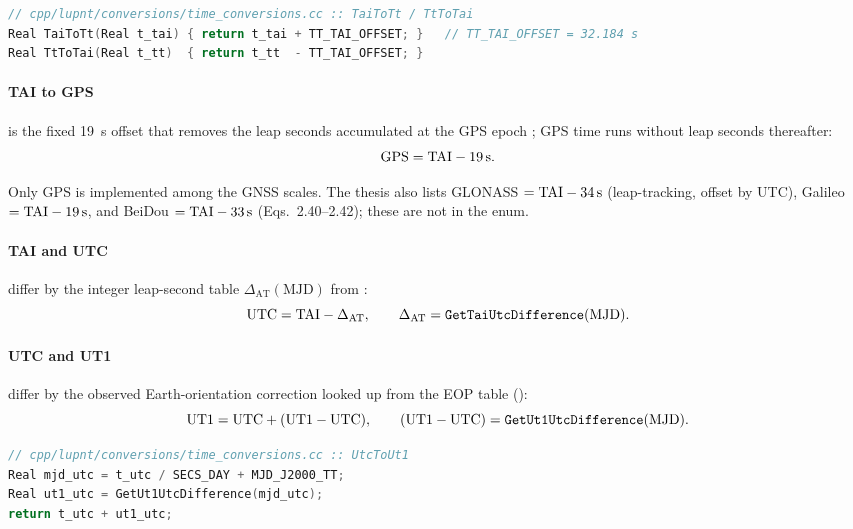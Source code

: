 \begin{lstlisting}[language=cpp]
// cpp/lupnt/conversions/time_conversions.cc :: TaiToTt / TtToTai
Real TaiToTt(Real t_tai) { return t_tai + TT_TAI_OFFSET; }   // TT_TAI_OFFSET = 32.184 s
Real TtToTai(Real t_tt)  { return t_tt  - TT_TAI_OFFSET; }
\end{lstlisting}

\paragraph{TAI to GPS} is the fixed \SI{19}{\second} offset that removes the
leap seconds accumulated at the GPS epoch
\citep[Eq.~2.39]{iiyama2026thesis}; GPS time runs without leap seconds
thereafter:
%
\begin{equation}
\label{eq:tc-gps}
  \mathrm{GPS} = \mathrm{TAI} - \SI{19}{\second} .
\end{equation}

\begin{lupntnote}
Only GPS is implemented among the GNSS scales. The thesis also lists
GLONASS $= \mathrm{TAI} - \SI{34}{\second}$ (leap-tracking, offset by UTC),
Galileo $= \mathrm{TAI} - \SI{19}{\second}$, and BeiDou $= \mathrm{TAI} - \SI{33}{\second}$
(Eqs.~2.40--2.42); these are not in the  enum.
\end{lupntnote}

\paragraph{TAI and UTC} differ by the integer leap-second table
$\Delta_{\mathrm{AT}}(\mathrm{MJD})$ from 
\citep[Eq.~2.43]{iiyama2026thesis}:
%
\begin{equation}
\label{eq:tc-utc}
  \mathrm{UTC} = \mathrm{TAI} - \Delta_{\mathrm{AT}},
  \qquad
  \Delta_{\mathrm{AT}} = \texttt{GetTaiUtcDifference}(\mathrm{MJD}) .
\end{equation}

\paragraph{UTC and UT1} differ by the observed Earth-orientation correction
looked up from the EOP table ():
%
\begin{equation}
\label{eq:tc-ut1}
  \mathrm{UT1} = \mathrm{UTC} + (\mathrm{UT1} - \mathrm{UTC}),
  \qquad
  (\mathrm{UT1} - \mathrm{UTC}) = \texttt{GetUt1UtcDifference}(\mathrm{MJD}) .
\end{equation}

\begin{lstlisting}[language=cpp]
// cpp/lupnt/conversions/time_conversions.cc :: UtcToUt1
Real mjd_utc = t_utc / SECS_DAY + MJD_J2000_TT;
Real ut1_utc = GetUt1UtcDifference(mjd_utc);
return t_utc + ut1_utc;
\end{lstlisting}


